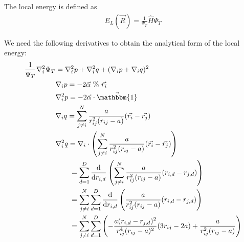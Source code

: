 \documentclass[12pt]{article}
\begin{document}
\noindent The local energy is defined as
\begin{align}
E_L(\vec{R}) = \frac{1}{\Psi_T}\hat{H}\Psi_T 
\end{align}

\noindent We need the following derivatives to obtain the analytical form of the local energy:
\begin{align*}
\frac{1}{\Psi_T}\nabla_i^2 \Psi_T &= \nabla_i^2 p + \nabla_i^2 q + (\nabla_i p + \nabla_i q)^2\\
&\nabla_i p = -2 \vec{\alpha} \ \% \ \vec{r_i}\\
&\nabla_i^2 p = -2 \vec{\alpha} \cdot \vec{\mathbbm{1}}\\
&\nabla_i q = \sum_{j \neq i}^N \frac{a}{r_{ij}^2(r_{ij}-a) }(\vec{r_i}-\vec{r_j})\\
&\nabla_i^2 q = \nabla_i \cdot \left( \sum_{j \neq i}^N \frac{a}{r_{ij}^2(r_{ij}-a)} (\vec{r_i}-\vec{r_j}) \right) \\
& \hspace*{7mm} = \sum_{d=1}^D \frac{\text{d}}{\text{d}r_{i,d}} \left( \sum_{j \neq i}^N \frac{a}{r_{ij}^2(r_{ij}-a) }(r_{i,d}-r_{j,d}) \right) \\
& \hspace*{7mm} = \sum_{j\neq i}^N \sum_{d=1}^D \frac{\text{d}}{\text{d}r_{i,d}} \left( \frac{a}{r_{ij}^2(r_{ij}-a) }(r_{i,d}-r_{j,d}) \right) \\
& \hspace*{7mm} = \sum_{j\neq i}^N \sum_{d=1}^D  \left( -\frac{a(r_{i,d}-r_{j,d})^2}{r_{ij}^4(r_{ij}-a)^2} (3r_{ij}-2a) + \frac{a}{r_{ij}^2(r_{ij}-a)}\right) \\
\end{align*}
\end{document}
